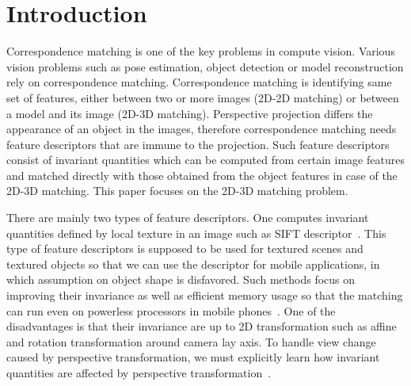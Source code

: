 \documentclass{bmvc2k}
\begin{document}
\section{Introduction}
\label{sec:intro}
Correspondence matching is one of the key problems in compute vision. 
Various vision problems such as pose estimation, object detection or model reconstruction rely on correspondence matching. 
Correspondence matching is identifying same set of features, either between two or more images (2D-2D matching) or between a model and its image (2D-3D matching).
Perspective projection differs the appearance of an object in the images, therefore correspondence matching needs feature descriptors that are immune to the projection.
Such feature descriptors consist of invariant quantities which can be computed from certain image features and matched directly with those obtained from the object features in case of the 2D-3D matching.
This paper focuses on the 2D-3D matching problem.

\par 
There are mainly two types of feature descriptors.
One computes invariant quantities defined by local texture in an image such as SIFT descriptor~\cite{Lowe1999}.
This type of feature descriptors is supposed to be used for textured scenes and textured objects so that we can use the descriptor for mobile applications, in which assumption on object shape is disfavored.
Such methods focus on improving their invariance as well as efficient memory usage so that the matching can run even on powerless processors in mobile phones~\cite{Ke2004,Calonder2010}.
One of the disadvantages is that their invariance are up to 2D transformation such as affine and rotation transformation around camera lay axis.
To handle view change caused by perspective transformation, we must explicitly learn how invariant quantities are affected by perspective transformation~\cite{Kurz2012,Lepetit2006}. 
\end{document}
